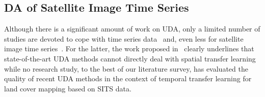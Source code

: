 \subsection{DA of Satellite Image Time Series}
\label{ssec:dasits}
Although there is a significant amount of work on UDA, only a limited number of studies are devoted to cope with time series data~\cite{WilsonDC20} and, even less for satellite image time series~\cite{9324339}. For the latter, the work proposed in~\cite{9324339} clearly underlines that state-of-the-art UDA methods cannot directly deal with spatial transfer learning while no research study, to the best of our literature survey, has evaluated the quality of recent UDA methods in the context of temporal transfer learning for land cover mapping based on SITS data.





